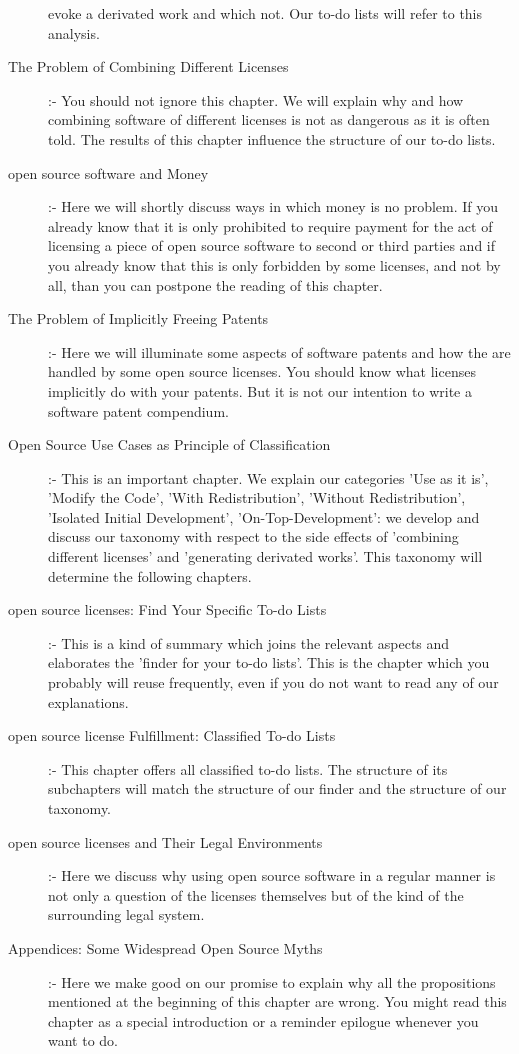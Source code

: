 \begin{description}
  evoke a derivated work and which not. Our to-do lists will refer to this
  analysis.
  \item[The Problem of Combining Different Licenses] :- You should
  not ignore this chapter. We will explain why and how combining software
  of different licenses is not as dangerous as it is often told. The results of
  this chapter influence the structure of our to-do lists.
  \item[open source software and Money] :- Here we will shortly
  discuss ways in which money is no problem. If you already know that it is only
  prohibited to require payment for the act of licensing a piece of open source
  software to second or third parties and if you already know that this is only
  forbidden by some licenses, and not by all, than you can postpone the reading
  of this chapter.
  \item[The Problem of Implicitly Freeing Patents] :- Here we
  will illuminate some aspects of software patents and how the are handled by
  some open source licenses. You should know what licenses implicitly do with
  your patents. But it is not our intention to write a software patent
  compendium.
  \item[Open Source Use Cases as Principle of Classification] :- This is an
  important chapter. We explain our categories 'Use as it is', 'Modify the
  Code', 'With Redistribution', 'Without Redistribution', 'Isolated Initial
  Development', 'On-Top-Development': we develop and discuss our taxonomy with
  respect to the side effects of 'combining different licenses' and 'generating
  derivated works'. This taxonomy will determine the following chapters.
  \item[open source licenses: Find Your Specific To-do Lists] :- This is a kind
  of summary which joins the relevant aspects and elaborates the 'finder
  for your to-do lists'. This is the chapter which you probably will reuse
  frequently, even if you do not want to read any of our explanations.
  \item[open source license Fulfillment: Classified To-do Lists] :- This chapter
  offers all classified to-do lists. The structure of its subchapters will
  match the structure of our finder and the structure of our taxonomy.
  \item[open source licenses and Their Legal Environments] :- Here we discuss
  why using open source software in a regular manner is not only a question of
  the licenses themselves but of the kind of the surrounding legal system.
  \item[Appendices: Some Widespread Open Source Myths] :- Here we make good on
  our promise to explain why all the propositions mentioned at the beginning of
  this chapter are wrong. You might read this chapter as a special introduction
  or a reminder epilogue whenever you want to do.
\end{description}


%
